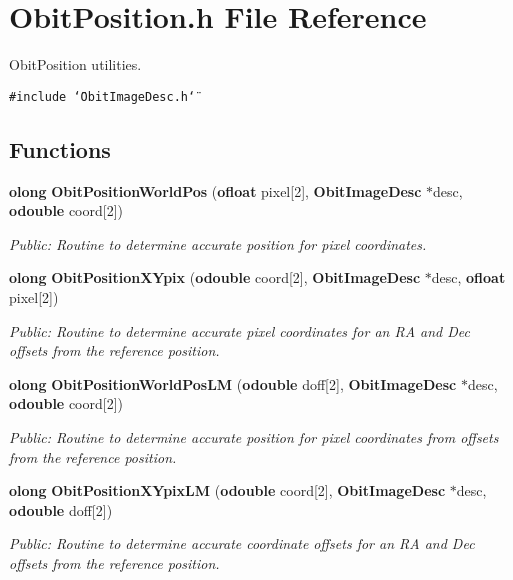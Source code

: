 \section{Obit\-Position.h File Reference}
\label{ObitPosition_8h}
Obit\-Position utilities. 

{\tt \#include \char`\"{}Obit\-Image\-Desc.h\char`\"{}}\par
\subsection*{Functions}
\begin{CompactItemize}
\item 
{\bf olong} {\bf Obit\-Position\-World\-Pos} ({\bf ofloat} pixel[2], {\bf Obit\-Image\-Desc} $\ast$desc, {\bf odouble} coord[2])
\begin{CompactList}\small\item\em Public: Routine to determine accurate position for pixel coordinates. \item\end{CompactList}\item 
{\bf olong} {\bf Obit\-Position\-XYpix} ({\bf odouble} coord[2], {\bf Obit\-Image\-Desc} $\ast$desc, {\bf ofloat} pixel[2])
\begin{CompactList}\small\item\em Public: Routine to determine accurate pixel coordinates for an RA and Dec offsets from the reference position. \item\end{CompactList}\item 
{\bf olong} {\bf Obit\-Position\-World\-Pos\-LM} ({\bf odouble} doff[2], {\bf Obit\-Image\-Desc} $\ast$desc, {\bf odouble} coord[2])
\begin{CompactList}\small\item\em Public: Routine to determine accurate position for pixel coordinates from offsets from the reference position. \item\end{CompactList}\item 
{\bf olong} {\bf Obit\-Position\-XYpix\-LM} ({\bf odouble} coord[2], {\bf Obit\-Image\-Desc} $\ast$desc, {\bf odouble} doff[2])
\begin{CompactList}\small\item\em Public: Routine to determine accurate coordinate offsets for an RA and Dec offsets from the reference position. \item\end{CompactList}\end{CompactItemize}



